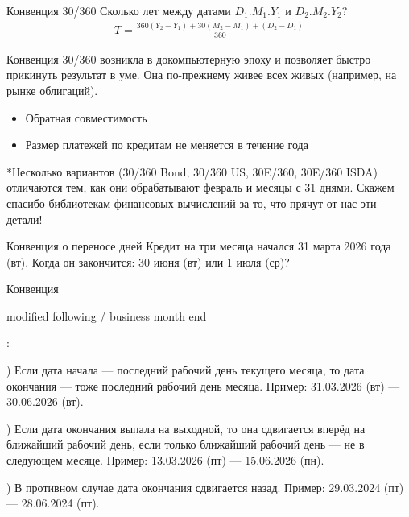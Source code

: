 \documentclass{beamer}
\newcommand{\en}[1]{\begin{otherlanguage}{english}#1\end{otherlanguage}}
\begin{document}
\begin{frame}{Конвенция 30/360}
\justify
Сколько лет между датами $D_1.M_1.Y_1$ и $D_2.M_2.Y_2$?
\begin{align*}
T = \frac{360(Y_2-Y_1) + 30(M_2-M_1) + (D_2-D_1)}{360}
\end{align*}

\justify
Конвенция 30/360 возникла в докомпьютерную эпоху и позволяет быстро прикинуть результат в уме. Она по-прежнему живее всех живых (например, на рынке облигаций).
\begin{itemize}
\item Обратная совместимость
\item Размер платежей по кредитам не меняется в течение года
\end{itemize}

\vspace{\baselineskip}
\justify
*Несколько вариантов (30/360 Bond, 30/360 US, 30E/360, 30E/360 ISDA) отличаются тем, как они обрабатывают февраль и месяцы с 31 днями. Скажем спасибо библиотекам финансовых вычислений за то, что прячут от нас эти детали!
\end{frame}



\begin{frame}{Конвенция о переносе дней}
\justify
Кредит на три месяца начался 31 марта 2026 года (вт). Когда он закончится: 30 июня (вт) или 1 июля (ср)?

\justify
Конвенция \en{modified following / business month end}:

) Если дата начала --- последний рабочий день текущего месяца, то дата окончания --- тоже последний рабочий день месяца. Пример: 31.03.2026 (вт) --- 30.06.2026 (вт).

) Если дата окончания выпала на выходной, то она сдвигается вперёд на ближайший 
рабочий день, если только ближайший рабочий день --- не в следующем месяце. Пример: 
13.03.2026 (пт) --- 15.06.2026 (пн).

) В противном случае дата окончания сдвигается назад. Пример: 29.03.2024 (пт) --- 28.06.2024 (пт).
\end{frame}
\end{document}
